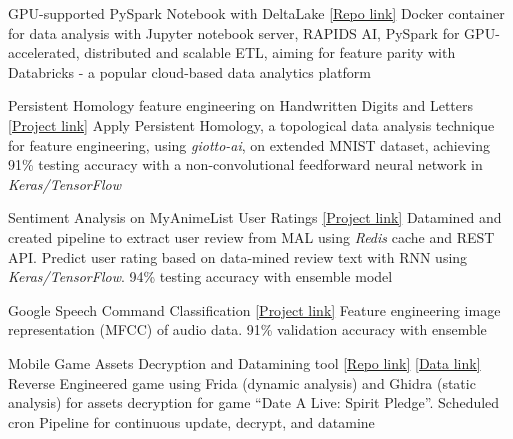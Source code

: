 
\begin{cventries}
	\cventry
	{}
	{GPU-supported PySpark Notebook with DeltaLake}
	{\href{https://github.com/n0k0m3/pyspark-notebook-deltalake-docker}{[Repo link]}}
	{}
	{Docker container for data analysis with Jupyter notebook server, RAPIDS AI, PySpark for GPU-accelerated, distributed and scalable ETL, aiming for feature parity with Databricks - a popular cloud-based data analytics platform}

	\cventry
	{}
	{Persistent Homology feature engineering on Handwritten Digits and Letters}
	{\href{https://colab.research.google.com/drive/18z161k3diYO6sNVBfiKH8uGqbrekxMPN?usp=sharing}{[Project link]}}
	{}
	{Apply Persistent Homology, a topological data analysis technique for feature engineering, using \emph{giotto-ai}, on extended MNIST dataset, achieving 91\% testing accuracy with a non-convolutional feedforward neural network in \emph{Keras/TensorFlow}}


	\cventry
	{}
	{Sentiment Analysis on MyAnimeList User Ratings}
	{\href{https://github.com/n0k0m3/rnn-mal-sentiment}{[Project link]}}
	{}
	{Datamined and created pipeline to extract user review from MAL using \emph{Redis} cache and REST API. Predict user rating based on data-mined review text with RNN using \emph{Keras/TensorFlow}. 94\% testing accuracy with ensemble model}

	\cventry
	{}
	{Google Speech Command Classification}
	{\href{https://colab.research.google.com/drive/1KCJjwgW6VDlANLmXYTotatk2xux3nw0N?usp=sharing}{[Project link]}}
	{}
	{Feature engineering image representation (MFCC) of audio data. 91\% validation accuracy with ensemble}

	\cventry
	{}
	{Mobile Game Assets Decryption and Datamining tool}
	{\href{https://github.com/n0k0m3/DALSP-Assets-Decryption-tool}{[Repo link]} \href{https://github.com/n0k0m3/DateALiveData}{[Data link]}}
	{}
	{Reverse Engineered game using Frida (dynamic analysis) and Ghidra (static analysis) for assets decryption for game ``Date A Live: Spirit Pledge''. Scheduled cron Pipeline for continuous update, decrypt, and datamine}

\end{cventries}